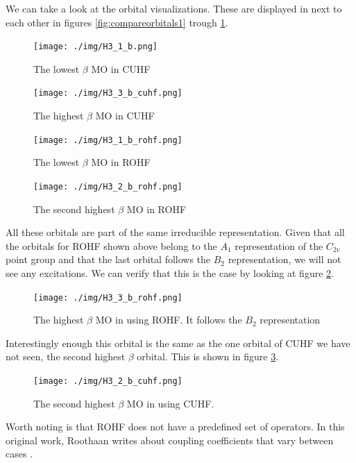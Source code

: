 We can take a look at the orbital visualizations.  These are displayed in next to each other in figures \ref{fig:compareorbitals1}
trough \ref{fig:compareorbitals4}. \\
\begin{figure}[H]
  \begin{minipage}[b]{0.5\linewidth}
    \texttt{[image: ./img/H3\_1\_b.png]}
    \caption{The lowest $\beta$ MO in CUHF}
    \label{fig:compareorbitals1}
  \end{minipage}
  \begin{minipage}[b]{0.5\linewidth}
    \texttt{[image: ./img/H3\_3\_b\_cuhf.png]}
    \caption{The highest $\beta$ MO in CUHF}
    \label{fig:compareorbitals2}
  \end{minipage}
  \begin{minipage}[b]{0.5\linewidth}
    \texttt{[image: ./img/H3\_1\_b\_rohf.png]}
    \caption{The lowest $\beta$ MO in ROHF}
    \label{fig:compareorbitals3}
  \end{minipage}
  \begin{minipage}[b]{0.5\linewidth}
    \texttt{[image: ./img/H3\_2\_b\_rohf.png]}
    \caption{The second highest $\beta$ MO in ROHF}
    \label{fig:compareorbitals4}
  \end{minipage}
\end{figure}
All these orbitals are part of the same irreducible representation. Given that all the orbitals for ROHF shown above belong to
the $A_1$ representation of the $C_{2v}$ point group and that the last orbital follows the $B_2$ representation, we will not see any excitations. We can verify that this is the case
by looking at figure \ref{fig:rohforbitalb2}.
\begin{figure}[H]
 \centering
  \texttt{[image: ./img/H3\_3\_b\_rohf.png]}
  \caption{The highest $\beta$ MO in  using ROHF. It follows the $B_2$ representation}
  \label{fig:rohforbitalb2}
\end{figure}
Interestingly enough this orbital is the same as the one orbital of CUHF we have not seen, the second highest $\beta$ orbital. This is shown in
figure \ref{fig:cuhforbitalb2}.
\begin{figure}[H]
    \centering
  \texttt{[image: ./img/H3\_2\_b\_cuhf.png]}
  \caption{The second highest $\beta$ MO in  using CUHF.}
  \label{fig:cuhforbitalb2}
\end{figure}
Worth noting is that ROHF does not have a predefined set of operators. In this original work, Roothaan writes about coupling coefficients that vary between cases \cite{Roothaan1960}.
